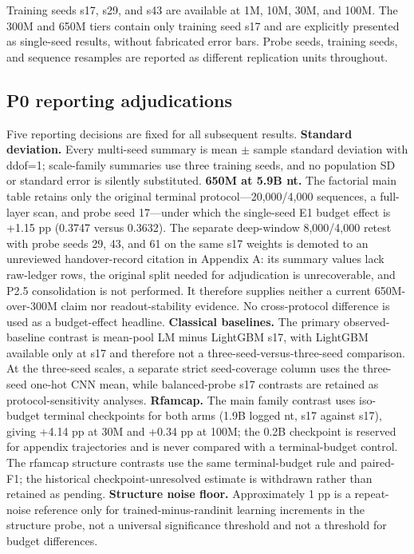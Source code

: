 Training seeds s17, s29, and s43 are available at 1M, 10M, 30M, and 100M. The 300M and 650M tiers contain only training seed s17 and are explicitly presented as single-seed results, without fabricated error bars. Probe seeds, training seeds, and sequence resamples are reported as different replication units throughout.

\hypertarget{p0-reporting-adjudications}{%
\subsection{P0 reporting adjudications}\label{p0-reporting-adjudications}}

Five reporting decisions are fixed for all subsequent results. \textbf{Standard deviation.} Every multi-seed summary is mean \(\pm\) sample standard deviation with ddof=1; scale-family summaries use three training seeds, and no population SD or standard error is silently substituted. \textbf{650M at 5.9B nt.} The factorial main table retains only the original terminal protocol---20,000/4,000 sequences, a full-layer scan, and probe seed 17---under which the single-seed E1 budget effect is +1.15 pp (0.3747 versus 0.3632). The separate deep-window 8,000/4,000 retest with probe seeds 29, 43, and 61 on the same s17 weights is demoted to an unreviewed handover-record citation in Appendix A: its summary values lack raw-ledger rows, the original split needed for adjudication is unrecoverable, and P2.5 consolidation is not performed. It therefore supplies neither a current 650M-over-300M claim nor readout-stability evidence. No cross-protocol difference is used as a budget-effect headline. \textbf{Classical baselines.} The primary observed-baseline contrast is mean-pool LM minus LightGBM s17, with LightGBM available only at s17 and therefore not a three-seed-versus-three-seed comparison. At the three-seed scales, a separate strict seed-coverage column uses the three-seed one-hot CNN mean, while balanced-probe s17 contrasts are retained as protocol-sensitivity analyses. \textbf{Rfamcap.} The main family contrast uses iso-budget terminal checkpoints for both arms (1.9B logged nt, s17 against s17), giving +4.14 pp at 30M and +0.34 pp at 100M; the 0.2B checkpoint is reserved for appendix trajectories and is never compared with a terminal-budget control. The rfamcap structure contrasts use the same terminal-budget rule and paired-F1; the historical checkpoint-unresolved estimate is withdrawn rather than retained as pending. \textbf{Structure noise floor.} Approximately 1 pp is a repeat-noise reference only for trained-minus-randinit learning increments in the structure probe, not a universal significance threshold and not a threshold for budget differences.

